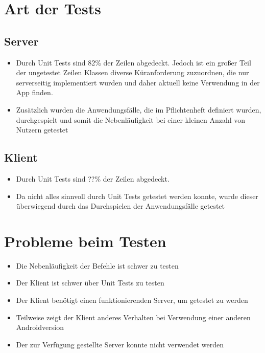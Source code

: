 \documentclass[parskip=full,11pt]{scrartcl}
\begin{document}
\section{Art der Tests}
	\subsection{Server}
		\begin{itemize}
			\item Durch Unit Tests sind 82\% der Zeilen abgedeckt.
						Jedoch ist ein großer Teil der ungetestet Zeilen Klassen
						diverse Küranforderung zuzuordnen, die nur serverseitig
						implementiert wurden und daher aktuell keine Verwendung in
						der App finden.
			\item Zusätzlich wurden die Anwendungsfälle, die im Pflichtenheft
						definiert wurden, durchgespielt und somit die Nebenläufigkeit
						bei einer kleinen Anzahl von Nutzern getestet
		\end{itemize}

	\subsection{Klient}
		\begin{itemize}
			\item Durch Unit Tests sind ??\% der Zeilen abgedeckt. %
			\item Da nicht alles sinnvoll durch Unit Tests getestet werden konnte,
						wurde dieser überwiegend durch das Durchspielen der
						Anwendungsfälle getestet
		\end{itemize}

\section{Probleme beim Testen}
	\begin{itemize}
		\item Die Nebenläufigkeit der Befehle ist schwer zu testen
		\item Der Klient ist schwer über Unit Tests zu testen
		\item Der Klient benötigt einen funktionierenden Server,
					um getestet zu werden
		\item Teilweise zeigt der Klient anderes Verhalten bei Verwendung einer
					anderen Androidversion
		\item Der zur Verfügung gestellte Server konnte nicht verwendet werden
	\end{itemize}
\end{document}
